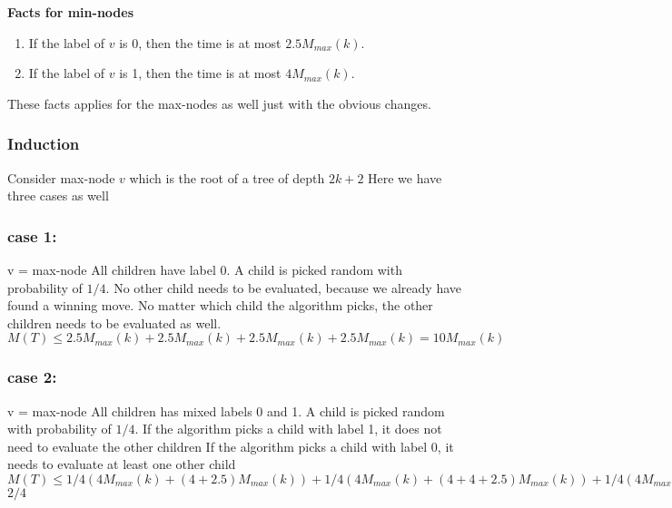 \documentclass[11pt]{article}
\newcommand\tab[1][0.5cm]{\hspace*{#1}}
\begin{document}
\textbf{Facts for min-nodes}
\begin{enumerate}
	\item If the label of $v$ is 0, then the time is at most $2.5 M_{max}(k)$.
	\item If the label of $v$ is 1, then the time is at most $4 M_{max}(k)$.
\end{enumerate}
These facts applies for the max-nodes as well just with the obvious changes.

\subsubsection*{Induction}

\tab Consider max-node $v$ which is the root of a tree of depth $2k+2$ \newline
\tab Here we have three cases as well \newline

\subsubsection*{case 1:}

\tab v = max-node \newline
\tab All children have label 0. \newline
\tab A child is picked random with probability of $1/4$. \newline
\tab No other child needs to be evaluated, because we already have found a winning move. \newline
\tab No matter which child the algorithm picks, the other children needs to be evaluated as well. \newline
\tab $M(T) \leq 2.5 M_{max}(k) + 2.5 M_{max}(k) + 2.5 M_{max}(k) + 2.5 M_{max}(k) = 10M_{max}(k)$

\subsubsection*{case 2:}

\tab v = max-node \newline
\tab All children has mixed labels 0 and 1. \newline
\tab A child is picked random with probability of $1/4$. \newline
\tab If the algorithm picks a child with label 1, it does not need to evaluate the other children \newline
\tab If the algorithm picks a child with label 0, it needs to evaluate at least one other child \newline
\tab $M(T) \leq 1/4(4M_{max}(k)+(4+2.5)M_{max}(k)) +1/4(4M_{max}(k)+(4+4+2.5)M_{max}(k))+ 1/4(4M_{max}(k)+(4+4+4+2.5)M_{max}(k)) < 32$ $2/4$
\end{document}
